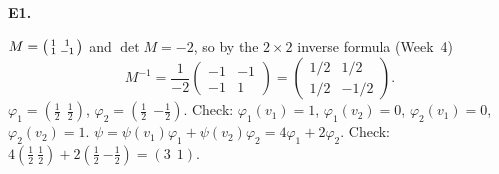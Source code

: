 \documentclass[10pt]{scrartcl}
\begin{document}
\begin{prob}\textbf{E1.}\par{}
\begin{steps}
  \ii $M=\begin{psmallmatrix}1&1\\1&-1\end{psmallmatrix}$ and $\det M=-2$, so by the $2\times2$ inverse formula (Week~4)
  \[
    M^{-1}=\frac1{-2}\begin{pmatrix}-1&-1\\-1&1\end{pmatrix}=\begin{pmatrix}1/2&1/2\\1/2&-1/2\end{pmatrix}.
  \]
  \ii $\varphi_1=(\tfrac12\ \ \tfrac12)$, $\varphi_2=(\tfrac12\ \ {-\tfrac12})$. Check: $\varphi_1(v_1)=1$, $\varphi_1(v_2)=0$, $\varphi_2(v_1)=0$, $\varphi_2(v_2)=1$.
  \ii $\psi=\psi(v_1)\varphi_1+\psi(v_2)\varphi_2=4\varphi_1+2\varphi_2$. Check: $4(\frac12\ \frac12)+2(\frac12\ {-\frac12})=(3\ \ 1)$.
\end{steps}
\end{prob}
\end{document}

